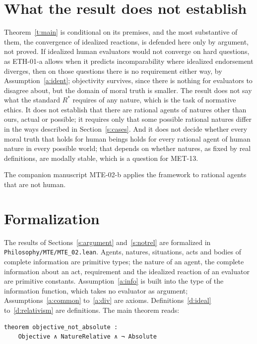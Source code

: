 \documentclass{situationist-preprint}
\begin{document}
\section{What the result does not establish}

Theorem~\ref{t:main} is conditional on its premises, and the most substantive of them, the convergence of idealized reactions, is defended here only by argument, not proved. If idealized human evaluators would not converge on hard questions, as ETH-01-a allows when it predicts incomparability where idealized endorsement diverges, then on those questions there is no requirement either way, by Assumption~\ref{a:ident}; objectivity survives, since there is nothing for evaluators to disagree about, but the domain of moral truth is smaller. The result does not say what the standard $R^*$ requires of any nature, which is the task of normative ethics. It does not establish that there are rational agents of natures other than ours, actual or possible; it requires only that some possible rational natures differ in the ways described in Section~\ref{s:cases}. And it does not decide whether every moral truth that holds for human beings holds for every rational agent of human nature in every possible world; that depends on whether natures, as fixed by real definitions, are modally stable, which is a question for MET-13.

The companion manuscript MTE-02-b applies the framework to rational agents that are not human.

\section{Formalization}\label{s:formal}

The results of Sections~\ref{s:argument} and~\ref{s:notrel} are formalized in \nolinkurl{Philosophy/MTE/MTE_02.lean}. Agents, natures, situations, acts and bodies of complete information are primitive types; the nature of an agent, the complete information about an act, requirement and the idealized reaction of an evaluator are primitive constants. Assumption~\ref{a:info} is built into the type of the information function, which takes no evaluator as argument; Assumptions~\ref{a:common} to~\ref{a:div} are axioms. Definitions~\ref{d:ideal} to~\ref{d:relativism} are definitions. The main theorem reads:

\begin{lstlisting}
theorem objective_not_absolute :
    Objective ∧ NatureRelative ∧ ¬ Absolute
\end{lstlisting}
\end{document}
